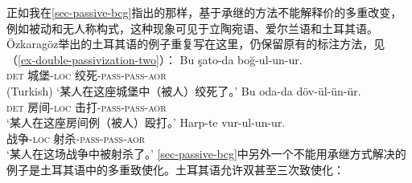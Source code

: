 \begin{exe}
\begin{xlist}[iv.]
\begin{exe}
\begin{xlist}[iv.]
正如我在\ref{sec-passive-bcg}指出的那样，基于承继的方法不能解释价的多重改变，例如被动和无人称构式，这种现象可见于立陶宛语\citep[Section~5]{Timberlake82a}、爱尔兰语\citep{Noonan94a}和土耳其语\citep{Ozkaragoez86a}。Özkaragöz举出的土耳其语的例子重复写在这里，仍保留原有的标注方法，见（\ref{ex-double-passivization-two}）：
\eal\label{ex-double-passivization-two}
\ex\label{ex-double-passivization-strangle-two}
\gll Bu şato-da boğ-ul-un-ur.\\
     \textsc{det} 城堡-\textsc{loc} 绞死-\textsc{pass}-\textsc{pass}-\textsc{aor}\\\hfill(Turkish)
\glt `某人在这座城堡中（被人）绞死了。'
\ex\label{ex-double-passivization-hit-two}
\gll Bu oda-da döv-ül-ün-ür.\\
     \textsc{det} 房间-\textsc{loc} 击打-\textsc{pass}-\textsc{pass}-\textsc{aor}\\
\glt `某人在这座房间例（被人）殴打。'
\ex
\gll Harp-te vur-ul-un-ur.\\
     战争-\textsc{loc} 射杀-\textsc{pass}-\textsc{pass}-\textsc{aor}\\
\glt `某人在这场战争中被射杀了。'
\zl
\ref{sec-passive-bcg}中另外一个不能用承继方式解决的例子是土耳其语中的多重致使化。土耳其语允许双甚至三次致使化\citep[]{Lewis67a-u}：

\end{xlist}
\end{exe}
\end{xlist}
\end{exe}
